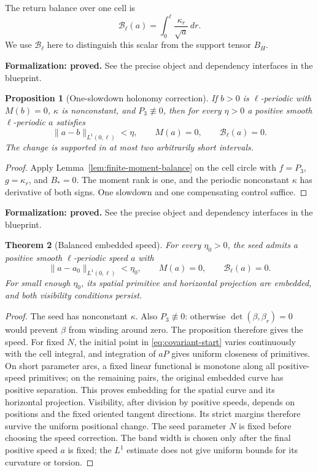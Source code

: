 \documentclass[11pt]{amsart}
\newtheorem{theorem}{Theorem}[section]
\newtheorem{proposition}[theorem]{Proposition}
\theoremstyle{definition}
\theoremstyle{remark}
\numberwithin{equation}{section}
\begin{document}
The return balance over one cell is
\begin{equation}\label{eq:balance-moment}
 \mathscr B_\ell(a)=\int_0^\ell\frac{\kappa_r}{\sqrt a}\,dr.
\end{equation}
We use $\mathscr B_\ell$ here to distinguish this scalar from the support
tensor $B_H$.

\par\noindent\textbf{Formalization: proved.} See the precise object and dependency interfaces in the blueprint.\par
\begin{proposition}[One-slowdown holonomy correction]\label{prop:one-slowdown}
If $b>0$ is $\ell$-periodic with $M(b)=0$, $\kappa$ is nonconstant,
and $P_3\not\equiv0$, then for every $\eta>0$ a positive smooth
$\ell$-periodic $a$ satisfies
\[
 \|a-b\|_{L^1(0,\ell)}<\eta,\qquad M(a)=0,
 \qquad\mathscr B_\ell(a)=0.
\]
The change is supported in at most two arbitrarily short intervals.
\end{proposition}
\begin{proof}
Apply Lemma~\ref{lem:finite-moment-balance} on the cell circle with
$f=P_3$, $g=\kappa_r$, and $B_*=0$. The moment rank is one, and the
periodic nonconstant $\kappa$ has derivative of both signs. One slowdown
and one compensating control suffice.
\end{proof}

\par\noindent\textbf{Formalization: proved.} See the precise object and dependency interfaces in the blueprint.\par
\begin{theorem}[Balanced embedded speed]\label{thm:spike}\label{lem:speed}
For every $\eta_0>0$, the seed admits a positive smooth $\ell$-periodic
speed $a$ with
\begin{equation}\label{eq:balanced-speed}
 \|a-a_0\|_{L^1(0,\ell)}<\eta_0,\qquad
 M(a)=0,\qquad\mathscr B_\ell(a)=0.
\end{equation}
For small enough $\eta_0$, its spatial primitive and horizontal
projection are embedded, and both visibility conditions persist.
\end{theorem}
\begin{proof}
The seed has nonconstant $\kappa$. Also $P_3\not\equiv0$: otherwise
$\det(\beta,\beta_r)=0$ would prevent $\beta$ from winding around zero.
The proposition therefore gives the speed. For fixed $N$, the initial
point in \eqref{eq:covariant-start} varies continuously with the cell
integral, and integration of $aP$ gives uniform closeness of primitives.
On short parameter arcs, a fixed linear functional is monotone along all
positive-speed primitives; on the remaining pairs, the original embedded
curve has positive separation. This proves embedding for the spatial
curve and its horizontal projection. Visibility, after division by positive
speeds, depends on positions and the fixed oriented tangent directions.
Its strict margins therefore survive the uniform positional change.
The seed parameter $N$ is fixed before choosing the speed correction.
The band width is chosen only after the final positive speed $a$ is
fixed; the $L^1$ estimate does not give uniform bounds for its curvature
or torsion.
\end{proof}
\end{document}
